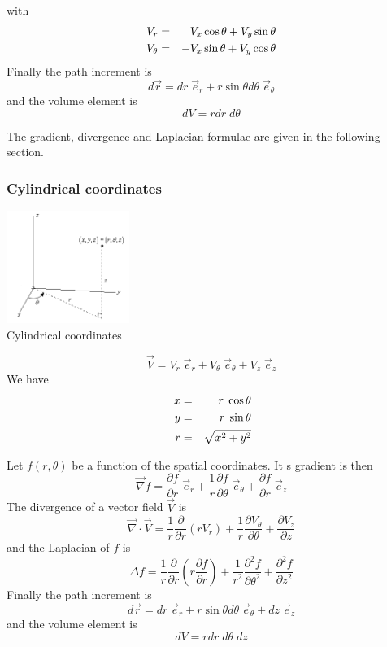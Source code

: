 with
\begin{eqnarray}
V_r &=& V_x \cos \theta + V_y \sin \theta \nonumber\\
V_\theta &=& - V_x \sin \theta + V_y \cos \theta \nonumber
\end{eqnarray}
Finally the path increment is
\[
d\vec{r} = dr \; {\vec e}_r  + r \sin\theta d\theta \; {\vec e}_\theta
\]
and the volume element is 
\[
dV= r dr \; d\theta
\]

The gradient, divergence and Laplacian formulae are given in the following section.


\subsubsection{Cylindrical coordinates \label{ss:cylcoord}}

\begin{center}
\includegraphics[width=4cm]{images/cylindrical}\\
{\captionfont Cylindrical coordinates}
\end{center}

\[
{\vec V} 
= V_r \; \vec{e}_r  + V_\theta \; \vec{e}_\theta + V_z \; \vec{e}_z
\]
We have 
\begin{eqnarray}
x &=& r \; \cos\theta \nn\\
y &=& r \; \sin \theta \nn\\\ 
r &=& \sqrt{x^2+y^2} \nn
\end{eqnarray}

Let $f(r,\theta)$ be a function of the spatial coordinates. It s gradient is then
\[
\vec \nabla f
= \frac{\partial f}{\partial r} \; \vec{e}_r 
+ \frac{1}{r} \frac{\partial f}{\partial \theta} \; \vec{e}_\theta
+ \frac{\partial f}{\partial r} \; \vec{e}_z
\]
The divergence of a vector field $\vec{V}$ is 
\[
\vec\nabla \cdot \vec{V} 
= \frac{1}{r} \frac{\partial }{\partial r} (r V_r) 
+ \frac{1}{r} \frac{\partial V_\theta}{\partial \theta} 
+ \frac{\partial V_z}{\partial z}
\]
and the Laplacian of $f$ is
\[
\Delta f = \frac{1}{r} \frac{\partial }{\partial r} \left( r \frac{\partial f}{\partial r} \right)
+ \frac{1}{r^2} \frac{\partial^2 f}{\partial \theta^2} 
+ \frac{\partial^2 f}{\partial z^2} 
\]
Finally the path increment is
\[
d\vec{r} = dr \; {\vec e}_r  + r \sin\theta d\theta \; {\vec e}_\theta + dz \; \vec{e}_z
\]
and the volume element is 
\[
dV= r dr \; d\theta \; dz
\]

